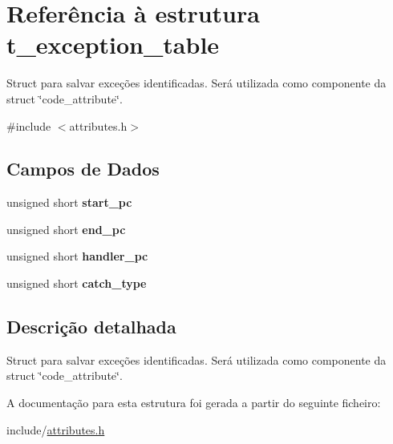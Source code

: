 \hypertarget{structt__exception__table}{}\section{Referência à estrutura t\+\_\+exception\+\_\+table}
\label{structt__exception__table}


Struct para salvar exceções identificadas. Será utilizada como componente da struct \char`\"{}code\+\_\+attribute\char`\"{}.  




{\ttfamily \#include $<$attributes.\+h$>$}

\subsection*{Campos de Dados}
\begin{DoxyCompactItemize}
\item 
\mbox{\label{structt__exception__table_a1e301f7924e5e2ebe75dbf5a4bb2b090}} 
unsigned short {\bfseries start\+\_\+pc}
\item 
\mbox{\label{structt__exception__table_a0e650c1f5254b1163fb64c19524e45cf}} 
unsigned short {\bfseries end\+\_\+pc}
\item 
\mbox{\label{structt__exception__table_adeddab7249cce7351d5f8387ccae0963}} 
unsigned short {\bfseries handler\+\_\+pc}
\item 
\mbox{\label{structt__exception__table_a948e8861147a4c9ce9df40ca1f5cf680}} 
unsigned short {\bfseries catch\+\_\+type}
\end{DoxyCompactItemize}


\subsection{Descrição detalhada}
Struct para salvar exceções identificadas. Será utilizada como componente da struct \char`\"{}code\+\_\+attribute\char`\"{}. 

A documentação para esta estrutura foi gerada a partir do seguinte ficheiro\+:\begin{DoxyCompactItemize}
\item 
include/\hyperlink{attributes_8h}{attributes.\+h}\end{DoxyCompactItemize}
